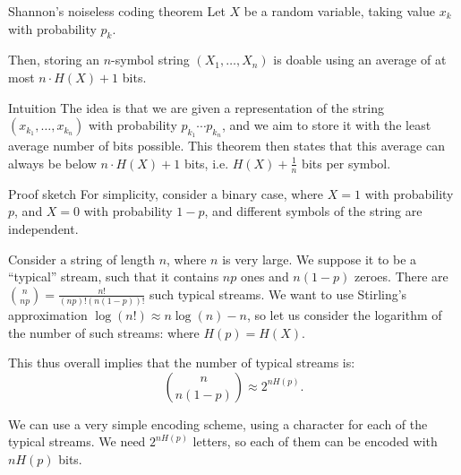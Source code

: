 \documentclass[a4paper]{article}
\begin{document}
\begin{parag}{Shannon's noiseless coding theorem}
    Let $X$ be a random variable, taking value $x_k$ with probability $p_k$.

    Then, storing an $n$-symbol string $\left(X_1, \ldots, X_n\right)$ is doable using an average of at most $n\cdot  H\left(X\right) + 1$ bits.

    \begin{subparag}{Intuition}
        The idea is that we are given a representation of the string $\left(x_{k_1}, \ldots, x_{k_n}\right)$ with probability $p_{k_1} \cdots p_{k_n}$, and we aim to store it with the least average number of bits possible. This theorem then states that this average can always be below $n \cdot H\left(X\right) + 1$ bits, i.e. $H\left(X\right) + \frac{1}{n}$ bits per symbol.
    \end{subparag}

    \begin{subparag}{Proof sketch}
        For simplicity, consider a binary case, where $X = 1$ with probability $p$, and $X = 0$ with probability $1-p$, and different symbols of the string are independent.

        Consider a string of length $n$, where $n$ is very large. We suppose it to be a ``typical'' stream, such that it contains $np$ ones and $n\left(1-p\right)$ zeroes. There are $\binom{n}{np} = \frac{n!}{\left(np\right)! \left(n\left(1-p\right)\right)!}$ such typical streams. We want to use Stirling's approximation $\log\left(n!\right) \approx n\log\left(n\right) - n$, so let us consider the logarithm of the number of such streams: 
        where $H\left(p\right) = H\left(X\right)$.

        This thus overall implies that the number of typical streams is: 
        \[\binom{n}{n\left(1-p\right)} \approx 2^{n H\left(p\right)}.\]

        We can use a very simple encoding scheme, using a character for each of the typical streams. We need $2^{n H\left(p\right)}$ letters, so each of them can be encoded with $nH\left(p\right)$ bits.
    \end{subparag}


\end{parag}
\end{document}
